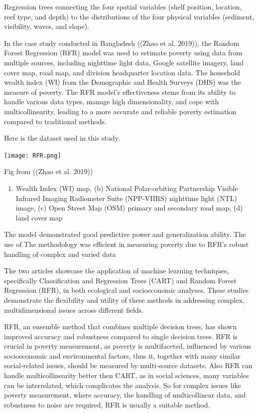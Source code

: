 \documentclass[
  letterpaper,
  DIV=11,
  numbers=noendperiod]{scrreprt}
\providecommand{\tightlist}{%
  \setlength{\itemsep}{0pt}\setlength{\parskip}{0pt}}\usepackage{longtable,booktabs,array}
\begin{document}
Regression trees connecting the four spatial variables (shelf position,
location, reef type, and depth) to the distributions of the four
physical variables (sediment, visibility, waves, and slope).

In the case study conducted in Bangladesh ((Zhao et al. 2019)), the
Random Forest Regression (RFR) model was used to estimate poverty using
data from multiple sources, including nighttime light data, Google
satellite imagery, land cover map, road map, and division headquarter
location data. The household wealth index (WI) from the Demographic and
Health Surveys (DHS) was the measure of poverty. The RFR model's
effectiveness stems from its ability to handle various data types,
manage high dimensionality, and cope with multicollinearity, leading to
a more accurate and reliable poverty estimation compared to traditional
methods.

Here is the dataset used in this study.

\texttt{[image: RFR.png]}

Fig from ((Zhao et al. 2019))

\begin{enumerate}
\def\labelenumi{(\alph{enumi})}
\tightlist
\item
  Wealth Index (WI) map, (b) National Polar-orbiting Partnership Visible
  Infrared Imaging Radiometer Suite (NPP-VIIRS) nighttime light (NTL)
  image, (c) Open Street Map (OSM) primary and secondary road map, (d)
  land cover map
\end{enumerate}

The model demonstrated good predictive power and generalization ability.
The use of The methodology was efficient in measuring poverty due to
RFR's robust handling of complex and varied data

The two articles showcase the application of machine learning
techniques, specifically Classification and Regression Trees (CART) and
Random Forest Regression (RFR), in both ecological and socioeconomic
analyses. These studies demonstrate the flexibility and utility of these
methods in addressing complex, multidimensional issues across different
fields.

RFR, an ensemble method that combines multiple decision trees, has shown
improved accuracy and robustness compared to single decision trees. RFR
is crucial in poverty measurement, as poverty is multifaceted,
influenced by various socioeconomic and environmental factors, thus it,
together with many similar social-related issues, should be measured by
multi-source datasets. Also RFR can handle multicollinearity better then
CART, as in social sciences, many variables can be interrelated, which
complicates the analysis. So for complex issues like poverty
measurement, where accuracy, the handling of multicollinear data, and
robustness to noise are required, RFR is usually a suitable method.
\end{document}

